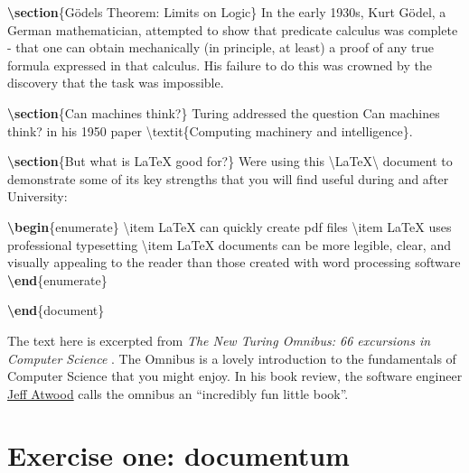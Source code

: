 \documentclass[
]{book}
\newenvironment{Shaded}{\begin{snugshade}}{\end{snugshade}}
\newcommand{\ExtensionTok}[1]{#1}
\newcommand{\FunctionTok}[1]{\textcolor[rgb]{0.00,0.00,0.00}{#1}}
\newcommand{\KeywordTok}[1]{\textcolor[rgb]{0.13,0.29,0.53}{\textbf{#1}}}
\newcommand{\NormalTok}[1]{#1}
\begin{document}
\begin{Shaded}
\begin{Highlighting}[]
\KeywordTok{\textbackslash{}section}\NormalTok{\{Gödel\textquotesingle{}s Theorem: Limits on Logic\}}
\NormalTok{In the early 1930\textquotesingle{}s, Kurt Gödel, a German mathematician, attempted to show that predicate calculus was complete {-} that one can obtain mechanically  (in principle, at least) a proof of any true formula expressed in that calculus. His failure to do this was crowned by the discovery that the task was impossible.}

\KeywordTok{\textbackslash{}section}\NormalTok{\{Can machines think?\}}
\NormalTok{Turing addressed the question \textasciigrave{}\textasciigrave{}Can machines think?\textquotesingle{}\textquotesingle{} in his 1950 paper }\FunctionTok{\textbackslash{}textit}\NormalTok{\{Computing machinery and intelligence\}.}

\KeywordTok{\textbackslash{}section}\NormalTok{\{But what is LaTeX good for?\}}
\NormalTok{We\textquotesingle{}re using this }\FunctionTok{\textbackslash{}LaTeX\textbackslash{} }\NormalTok{document to demonstrate some of its key strengths that you will find useful during and after University:}

\KeywordTok{\textbackslash{}begin}\NormalTok{\{}\ExtensionTok{enumerate}\NormalTok{\}}
\FunctionTok{\textbackslash{}item}\NormalTok{ LaTeX can quickly create pdf files}
\FunctionTok{\textbackslash{}item}\NormalTok{ LaTeX uses professional typesetting}
\FunctionTok{\textbackslash{}item}\NormalTok{ LaTeX documents can be more legible, clear, and visually appealing to the reader than those created with word processing software}
\KeywordTok{\textbackslash{}end}\NormalTok{\{}\ExtensionTok{enumerate}\NormalTok{\}}

\KeywordTok{\textbackslash{}end}\NormalTok{\{}\ExtensionTok{document}\NormalTok{\}}
\end{Highlighting}
\end{Shaded}

The text here is excerpted from \emph{The New Turing Omnibus: 66 excursions in Computer Science} \citep{turingomnibus}. The Omnibus is a lovely introduction to the fundamentals of Computer Science that you might enjoy. In his book review, the software engineer \href{https://en.wikipedia.org/wiki/Jeff_Atwood}{Jeff Atwood} calls the omnibus an ``incredibly fun little book''. \citep{codinghorror}

\hypertarget{ex1}{%
\section{Exercise one: documentum}\label{ex1}}
\end{document}
